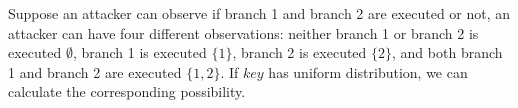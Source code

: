 Suppose an attacker can observe if branch 1 and branch 2 are executed or not, 
an attacker can have four different observations: neither branch 1 or 
branch 2 is executed $\emptyset$, branch 1 is executed $\{1\}$, branch 2
is executed $\{2\}$, and both branch 1 and branch 2 are executed $\{1, 2\}$.
If $key$ has uniform distribution, we can calculate the corresponding
possibility.







